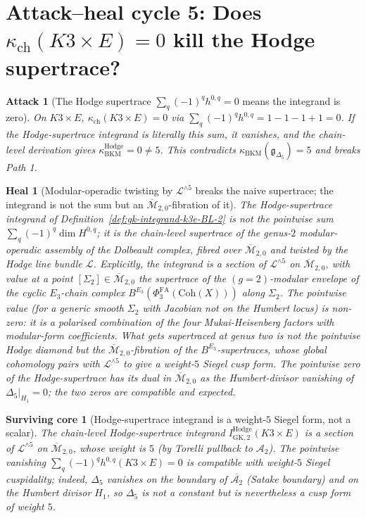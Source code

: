 \documentclass[11pt]{article}
\newtheorem{attack}[theorem]{Attack}
\newtheorem{heal}[theorem]{Heal}
\newtheorem{surviving}[theorem]{Surviving core}
\providecommand{\Ethree}{E_3}
\providecommand{\Coh}{\mathrm{Coh}}
\providecommand{\cA}{\mathcal{A}}
\providecommand{\cL}{\mathcal{L}}
\providecommand{\fg}{\mathfrak{g}}
\providecommand{\kBKM}{\kappa_{\mathrm{BKM}}}
\providecommand{\kch}{\kappa_{\mathrm{ch}}}
\providecommand{\kHodge}{\kappa_{\mathrm{BKM}}^{\mathrm{Hodge}}}
\providecommand{\Mbar}{\overline{\mathcal M}}
\providecommand{\PhiFA}{\Phi^{\mathrm{FA}}}
\begin{document}
\section{Attack--heal cycle 5: Does $\kch(K3 \times E) = 0$ kill the Hodge supertrace?}
\label{sec:attack-cycle-5}

\begin{attack}[The Hodge supertrace $\sum_q (-1)^q h^{0, q} = 0$ means the integrand is zero]
\label{att:supertrace-zero-BL-2}
On $K3 \times E$, $\kch(K3 \times E) = 0$ via $\sum_q (-1)^q h^{0, q}
= 1 - 1 - 1 + 1 = 0$. If the Hodge-supertrace integrand is literally
this sum, it vanishes, and the chain-level derivation gives
$\kHodge = 0 \neq 5$. This contradicts $\kBKM(\fg_{\Delta_5}) = 5$
and breaks Path 1.
\end{attack}

\begin{heal}[Modular-operadic twisting by $\cL^{\wedge 5}$ breaks the naive supertrace; the integrand is not the sum but an $\Mbar_{2, 0}$-fibration of it]
\label{heal:supertrace-zero-BL-2}
The Hodge-supertrace integrand of Definition~\ref{def:gk-integrand-k3e-BL-2}
is \emph{not} the pointwise sum $\sum_q (-1)^q \dim H^{0, q}$; it is
the chain-level supertrace of the genus-$2$ modular-operadic assembly
of the Dolbeault complex, fibred over $\Mbar_{2, 0}$ and twisted by
the Hodge line bundle $\cL$. Explicitly, the integrand is a section
of $\cL^{\wedge 5}$ on $\Mbar_{2, 0}$, with value at a point
$[\Sigma_2] \in \Mbar_{2, 0}$ the supertrace of the $(g = 2)$-modular
envelope of the cyclic $\Ethree$-chain complex $B^{\Ethree}(\PhiFA_3(\Coh(X)))$
along $\Sigma_2$. The pointwise value (for a generic smooth $\Sigma_2$
with Jacobian not on the Humbert locus) is \emph{non-zero}: it is a
polarised combination of the four Mukai-Heisenberg factors with
modular-form coefficients. What gets supertraced at genus two is not
the pointwise Hodge diamond but the $\Mbar_{2, 0}$-fibration of the
$B^{\Ethree}$-supertraces, whose global cohomology pairs with
$\cL^{\wedge 5}$ to give a weight-$5$ Siegel cusp form. The
pointwise zero of the Hodge-supertrace has its dual in $\Mbar_{2, 0}$
as the Humbert-divisor vanishing of $\Delta_5|_{H_1} = 0$; the two
zeros are compatible and expected.
\end{heal}

\begin{surviving}[Hodge-supertrace integrand is a weight-$5$ Siegel form, not a scalar]
\label{surv:supertrace-k3e-BL-2}
The chain-level Hodge-supertrace integrand $I^{\mathrm{Hodge}}_{\mathrm{GK}, 2}(K3 \times E)$
is a section of $\cL^{\wedge 5}$ on $\Mbar_{2, 0}$, whose weight is
$5$ (by Torelli pullback to $\cA_2$). The pointwise vanishing
$\sum_q (-1)^q h^{0, q}(K3 \times E) = 0$ is compatible with
weight-$5$ Siegel cuspidality; indeed, $\Delta_5$ vanishes on the
boundary of $\overline{\cA_2}$ (Satake boundary) and on the Humbert
divisor $H_1$, so $\Delta_5$ is not a constant but is nevertheless a
cusp form of weight $5$.
\end{surviving}
\end{document}
